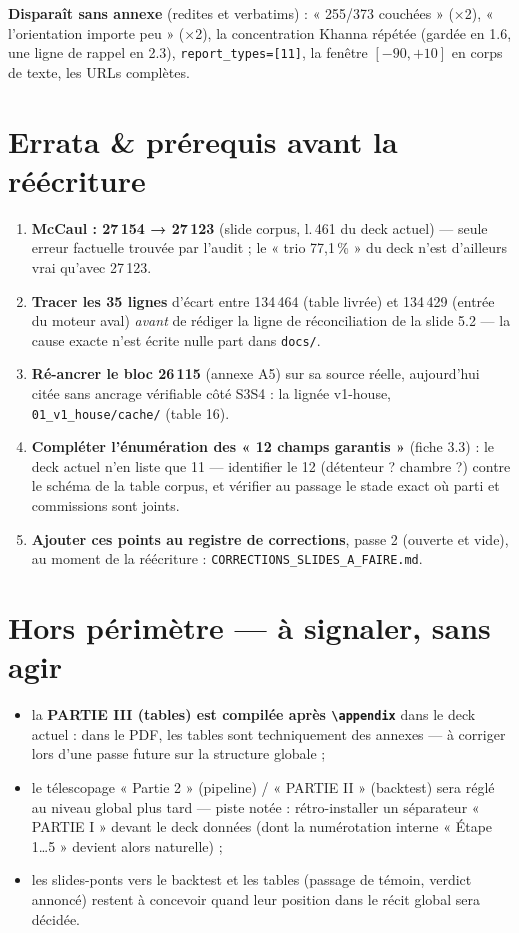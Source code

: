 \documentclass[11pt,a4paper]{article}
\newcommand{\co}[1]{\texttt{#1}}
\begin{document}
\noindent\textbf{Disparaît sans annexe} (redites et verbatims) : « 255/373 couchées » (×2),
« l'orientation importe peu » (×2), la concentration Khanna répétée (gardée en 1.6, une
ligne de rappel en 2.3), \co{report\_types=[11]}, la fenêtre $[-90, +10]$ en corps de
texte, les URLs complètes.

\section{Errata \& prérequis avant la réécriture}
\label{sec:errata}

\begin{enumerate}[itemsep=1pt, topsep=2pt]
  \item \textbf{McCaul : 27\,154 → 27\,123} (slide corpus, l.\,461 du deck actuel) ---
        seule erreur factuelle trouvée par l'audit ; le « trio 77,1\,\% » du deck n'est
        d'ailleurs vrai qu'avec 27\,123.
  \item \textbf{Tracer les 35 lignes} d'écart entre 134\,464 (table livrée) et 134\,429
        (entrée du moteur aval) \emph{avant} de rédiger la ligne de réconciliation de la
        slide 5.2 --- la cause exacte n'est écrite nulle part dans \co{docs/}.
  \item \textbf{Ré-ancrer le bloc 26\,115} (annexe A5) sur sa source réelle, aujourd'hui
        citée sans ancrage vérifiable côté S3S4 : la lignée v1-house,
        \co{01\_v1\_house/cache/} (table 16).
  \item \textbf{Compléter l'énumération des « 12 champs garantis »} (fiche 3.3) : le deck
        actuel n'en liste que 11 --- identifier le 12\ieme{} (détenteur ? chambre ?) contre
        le schéma de la table corpus, et vérifier au passage le stade exact où parti et
        commissions sont joints.
  \item \textbf{Ajouter ces points au registre de corrections}, passe 2 (ouverte et
        vide), au moment de la réécriture : \co{CORRECTIONS\_SLIDES\_A\_FAIRE.md}.
\end{enumerate}

\section{Hors périmètre --- à signaler, sans agir}

\begin{itemize}[itemsep=1pt, topsep=2pt]
  \item la \textbf{PARTIE III (tables) est compilée après \co{\textbackslash appendix}}
        dans le deck actuel : dans le PDF, les tables sont techniquement des annexes ---
        à corriger lors d'une passe future sur la structure globale ;
  \item le télescopage « Partie 2 » (pipeline) / « PARTIE II » (backtest) sera réglé au
        niveau global plus tard --- piste notée : rétro-installer un séparateur
        « PARTIE I » devant le deck données (dont la numérotation interne « Étape 1…5 »
        devient alors naturelle) ;
  \item les slides-ponts vers le backtest et les tables (passage de témoin, verdict
        annoncé) restent à concevoir quand leur position dans le récit global sera
        décidée.
\end{itemize}
\end{document}
